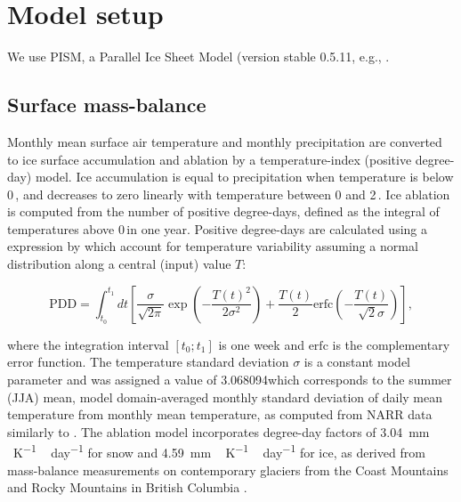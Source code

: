 \section{Model setup}
\label{sec:model}

We use PISM, a Parallel Ice Sheet Model (version stable 0.5.11, e.g., \citet{bueler-brown-2009,winkelmann-etal-2011,aschwanden-etal-2012,web:pism}.

\subsection{Surface mass-balance}

Monthly mean surface air temperature and monthly precipitation are converted to ice surface accumulation and ablation by a temperature-index (positive degree-day) model\needref. Ice accumulation is equal to precipitation when temperature is below 0\,\degC, and decreases to zero linearly with temperature between 0 and 2\,\degC. Ice ablation is computed from the number of positive degree-days, defined as the integral of temperatures above 0\,\degC in one year. Positive degree-days are calculated using a expression by \citet{calov-greve-2005} which account for temperature variability assuming a normal distribution along a central (input) value $T$:

\begin{equation}
	\mathrm{PDD} = \int_{t_0}^{t_1} dt \left[
		\frac{\sigma}{\sqrt{2\pi}}
		\exp\left({-\frac{T(t)^2}{2\sigma^2}}\right)
		+\frac{T(t)}{2}
		\mathrm{erfc} \left(-\frac{T(t)}{\sqrt{2}\sigma}\right)
	\right],
\end{equation}

where the integration interval $[t_0; t_1]$ is one week and $\mathrm{erfc}$ is the complementary error function. The temperature standard deviation $\sigma$  is a constant model parameter and was assigned a value of 3.068094\degC which corresponds to the summer (JJA) mean, model domain-averaged monthly standard deviation of daily mean temperature from monthly mean temperature, as computed from NARR data similarly to \citet{seguinot-inreview}. The ablation model incorporates degree-day factors of 3.04~\unit{mm\,K^{-1}\,day^{-1}} for snow and 4.59~\unit{mm\,K^{-1}\,day^{-1}} for ice, as derived from mass-balance measurements on contemporary glaciers from the Coast Mountains and Rocky Mountains in British Columbia \citep{shea-etal-2009}.

